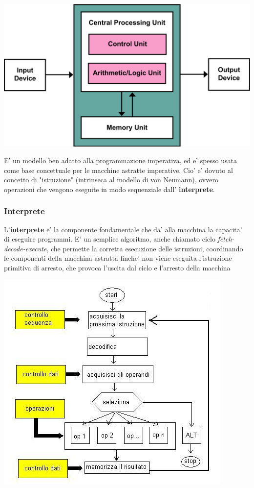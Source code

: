 \begin{center}
  \includegraphics[scale=0.2]{img/VonNeumann.png}
\end{center}

E' un modello ben adatto alla programmazione imperativa, ed e' spesso usata come base concettuale per le macchine astratte imperative. Cio' e' dovuto al concetto di "istruzione" (intrinseca al modello di von Neumann), ovvero operazioni che vengono eseguite in modo sequenziale dall' \textbf{interprete}.

\subsubsection{Interprete}
\label{interp}
L'\textbf{interprete} e' la componente fondamentale che da' alla macchina la capacita' di eseguire programmi. E' un semplice algoritmo, anche chiamato ciclo \textit{fetch-decode-execute}, che permette la corretta esecuzione delle istruzioni, coordinando le componenti della macchina astratta finche' non viene eseguita l'istruzione primitiva di arresto, che provoca l'uscita dal ciclo e l'arresto della macchina

\begin{center}
  \includegraphics[scale=0.7]{img/Interprete.JPG}
\end{center}

